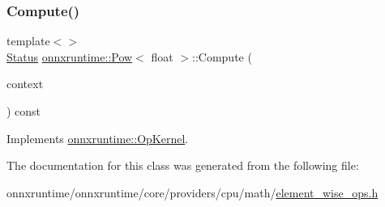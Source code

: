 \subsubsection{\texorpdfstring{Compute()}{Compute()}\hspace{0.1cm}{\footnotesize\ttfamily [2/2]}}
{\footnotesize\ttfamily template$<$$>$ \\
\mbox{\hyperlink{classonnxruntime_1_1common_1_1Status}{Status}} \mbox{\hyperlink{classonnxruntime_1_1Pow}{onnxruntime\+::\+Pow}}$<$ float $>$\+::Compute (\begin{DoxyParamCaption}\item[{\mbox{\hyperlink{classonnxruntime_1_1OpKernelContext}{Op\+Kernel\+Context}} $\ast$}]{context }\end{DoxyParamCaption}) const\hspace{0.3cm}{\ttfamily [virtual]}}



Implements \mbox{\hyperlink{classonnxruntime_1_1OpKernel_a9eca8656a78b1b3ab9d3351a12798650}{onnxruntime\+::\+Op\+Kernel}}.



The documentation for this class was generated from the following file\+:\begin{DoxyCompactItemize}
\item 
onnxruntime/onnxruntime/core/providers/cpu/math/\mbox{\hyperlink{element__wise__ops_8h}{element\+\_\+wise\+\_\+ops.\+h}}\end{DoxyCompactItemize}
